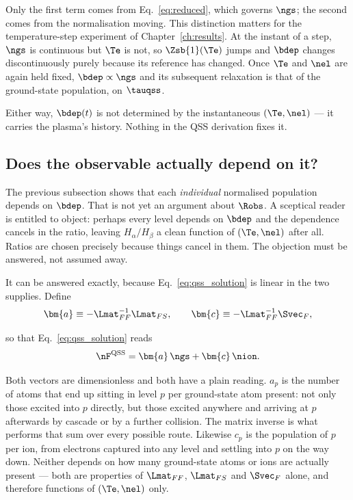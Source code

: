 \noindent Only the first term comes from Eq.~\eqref{eq:reduced}, which governs
$\ngs$; the second comes from the normalisation moving. This distinction matters
for the temperature-step experiment of Chapter~\ref{ch:results}. At the instant
of a step, $\ngs$ is continuous but $\Te$ is not, so $\Zsb{1}(\Te)$ jumps and
$\bdep$ changes discontinuously purely because its reference has changed. Once
$\Te$ and $\nel$ are again held fixed, $\bdep \propto \ngs$ and its subsequent
relaxation is that of the ground-state population, on $\tauqss$.

Either way, $\bdep(t)$ is not determined by the instantaneous $(\Te, \nel)$ ---
it carries the plasma's history. Nothing in the QSS derivation fixes it.

\subsection{Does the observable actually depend on it?}
\label{sec:R_depends_on_b}

The previous subsection shows that each \emph{individual} normalised population
depends on $\bdep$. That is not yet an argument about $\Robs$. A sceptical
reader is entitled to object: perhaps every level depends on $\bdep$ and the
dependence cancels in the ratio, leaving $H_\alpha/H_\beta$ a clean function of
$(\Te,\nel)$ after all. Ratios are chosen precisely because things cancel in
them. The objection must be answered, not assumed away.

It can be answered exactly, because Eq.~\eqref{eq:qss_solution} is linear in the
two supplies. Define
\begin{equation}
  \bm{a} \equiv -\Lmat_{FF}^{-1}\Lmat_{FS},
  \qquad
  \bm{c} \equiv -\Lmat_{FF}^{-1}\Svec_F ,
  \label{eq:ac_def}
\end{equation}

\noindent so that Eq.~\eqref{eq:qss_solution} reads
\begin{equation}
  \nF^{\mathrm{QSS}} = \bm{a}\,\ngs + \bm{c}\,\nion .
  \label{eq:two_supplies}
\end{equation}

Both vectors are dimensionless and both have a plain reading. $a_p$ is the
number of atoms that end up sitting in level $p$ per ground-state atom present:
not only those excited into $p$ directly, but those excited anywhere and
arriving at $p$ afterwards by cascade or by a further collision. The matrix
inverse is what performs that sum over every possible route. Likewise $c_p$ is
the population of $p$ per ion, from electrons captured into any level and
settling into $p$ on the way down. Neither depends on how many ground-state
atoms or ions are actually present --- both are properties of $\Lmat_{FF}$,
$\Lmat_{FS}$ and $\Svec_F$ alone, and therefore functions of $(\Te,\nel)$ only.

